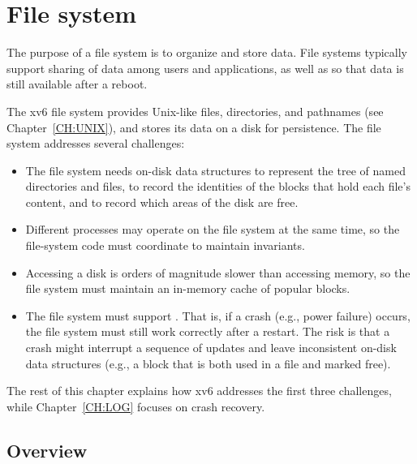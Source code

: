 \chapter{File system}
\label{CH:FS}
% 
% 
% 	
% 

The purpose of a file system is to organize and store data. File systems
typically support sharing of data among users and applications, as well as
so that data is still available after a reboot.

The xv6 file system provides Unix-like files, directories, and pathnames
(see Chapter~\ref{CH:UNIX}), and stores its data on a disk for
persistence. The file system addresses
several challenges:
\begin{itemize}
  
\item The file system needs on-disk data structures to represent the tree
of named directories and files, to record the identities of the
blocks that hold each file's content, and to record which areas
of the disk are free.
\item Different processes may operate on the file system at the same time,
so the file-system code must coordinate to maintain invariants.
\item Accessing a disk is orders of magnitude slower than accessing
memory, so the file system must maintain an in-memory cache of
popular blocks.
\item The file system must support
.
That is, if a crash (e.g., power failure) occurs, the file system must
still work correctly after a restart. The risk is that a crash might
interrupt a sequence of updates and leave inconsistent on-disk data
structures (e.g., a block that is both used in a file and marked free).

\end{itemize}

The rest of this chapter explains how xv6 addresses the first three
challenges,
while Chapter~\ref{CH:LOG}
focuses on crash recovery.

\section{Overview}

